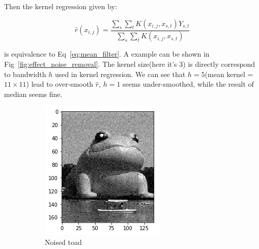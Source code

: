 \documentclass{beamer}
\begin{document}
\begin{frame}
  Then the kernel regression given by:
    
  $$
  \hat{r}(x_{i,j}) = \frac{\sum_{s} \sum_{t} K(x_{i,j},x_{s,t}) Y_{s,t}}{\sum_{s} \sum_{t} K(x_{i,j},x_{s,t})}
  $$
  
  is equivalence to Eq~\ref{eq:mean_filter}. A example can be shown in Fig~\ref{fig:effect_noise_removal}. 
  The kernel size(here it's $3$) is directly correspond to bandwidth $h$ used in kernel regression. 
  We can see that $h=5$(mean kernel = $11 \times 11 $) lead to over-smooth $\hat{r}$, $h=1$ seems under-smoothed,
  while the result of median seems fine.

  
  \begin{figure}[htb]
    \centering
    \begin{subfigure}[b]{0.24\linewidth}
      \includegraphics[width=\linewidth]{images/noise_removal_1.png}
      \caption{Noised toad}
    \end{subfigure}
    \begin{subfigure}[b]{0.24\linewidth}

\end{subfigure}
\end{figure}
\end{frame}
\end{document}

